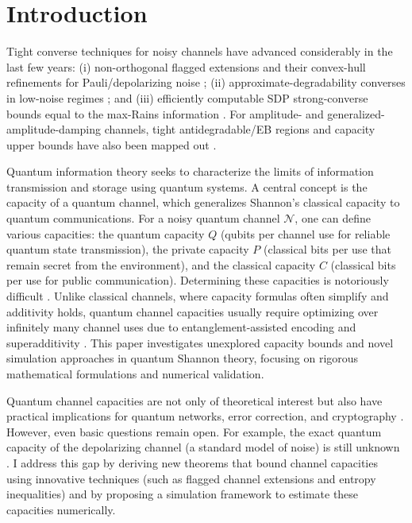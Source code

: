 \documentclass[11pt]{article}
\theoremstyle{plain}
\theoremstyle{definition}
\numberwithin{equation}{section}
\begin{document}
\section{Introduction}


Tight converse techniques for noisy channels have advanced considerably in the last few years: 
(i) non-orthogonal flagged extensions and their convex-hull refinements for Pauli/depolarizing
 noise \cite{FKG20,KFG22}; 
(ii) approximate-degradability converses in low-noise regimes \cite{Sutter17}; and 
(iii) efficiently computable SDP strong-converse bounds equal to the max-Rains information \cite{Wang19,Wang21}. 
For amplitude- and generalized-amplitude-damping channels, tight antidegradable/EB regions and capacity upper bounds have also been mapped out \cite{Khatri20}.

Quantum information theory seeks to characterize the limits of information transmission and storage using quantum systems. A central concept is the capacity of a quantum channel, which generalizes Shannon’s classical capacity to quantum communications. For a noisy quantum channel $\mathcal{N}$, one can define various capacities: the quantum capacity $Q$ (qubits per channel use for reliable quantum state transmission), the private capacity $P$ (classical bits per use that remain secret from the environment), and the classical capacity $C$ (classical bits per use for public communication). Determining these capacities is notoriously difficult \cite{11}. Unlike classical channels, where capacity formulas often simplify and additivity holds, quantum channel capacities usually require optimizing over infinitely many channel uses due to entanglement-assisted encoding and superadditivity \cite{11}. This paper investigates unexplored capacity bounds and novel simulation approaches in quantum Shannon theory, focusing on rigorous mathematical formulations and numerical validation.


Quantum channel capacities are not only of theoretical interest but also have practical implications for quantum networks, error correction, and cryptography \cite{11}. However, even basic questions remain open. For example, the exact quantum capacity of the depolarizing channel (a standard model of noise) is still unknown \cite{22}. I address this gap by deriving new theorems that bound channel capacities using innovative techniques (such as flagged channel extensions and entropy inequalities) and by proposing a simulation framework to estimate these capacities numerically.
\end{document}
